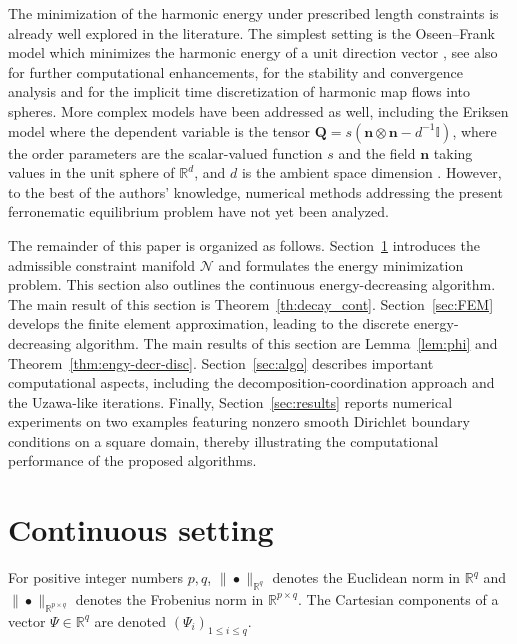 \documentclass[a4paper,11pt]{article}
\theoremstyle{definition}
\theoremstyle{remark}
\numberwithin{equation}{section}
\newcommand{\Qvec}{{\boldsymbol Q}}
\newcommand{\Real}{\mathbb{R}}
\newcommand{\bbI}{\mathbb{I}}
\newcommand{\bn}{{\boldsymbol n}}
\newcommand{\calN}{\mathcal{N}}
\begin{document}
The minimization of the harmonic energy under prescribed length constraints is already well explored in the literature. The simplest setting is the Oseen--Frank model which minimizes the harmonic energy of a unit direction vector   \cite{Alouges:1997:Harmonic_map,Cohen:Lin:Luskin,Lin:Luskin:1989},  see also \cite{Pierre2004}  for further computational enhancements,  \cite{Bartels:2005:FEscheme_harmonic_maps}  for the stability and convergence analysis and  \cite{Bartels:2007:harmonic-map-flow}  for the implicit time discretization of harmonic map flows into spheres. More complex models have been addressed as well, including the Eriksen model where the dependent variable is the tensor $\Qvec=s(\bn\otimes\bn - d^{-1}\bbI)$, where the order parameters are the scalar-valued function $s$ and the field $\bn$ taking values in the unit sphere of $\Real^d$, and $d$ is the ambient space dimension \cite{Bartels:2014:Q-tensor,Nochetto:2017:FEM,Borthagaray2020}.  However, to the best of the authors' knowledge, numerical methods addressing the present ferronematic equilibrium problem have not yet been analyzed.

The remainder of this paper is organized as follows. Section~\ref{sec:cont} introduces the admissible constraint manifold $\calN$ and formulates the energy minimization problem. This section also outlines the continuous energy-decreasing algorithm. The main result of this section is Theorem~\ref{th:decay_cont}. Section~\ref{sec:FEM} develops the finite element approximation, leading to the discrete energy-decreasing algorithm. The main results of this section are Lemma~\ref{lem:phi} and Theorem~\ref{thm:engy-decr-disc}.
Section~\ref{sec:algo} describes important computational aspects, including the decomposition-coordination approach and the Uzawa-like iterations. Finally, Section~\ref{sec:results} reports numerical experiments on two examples featuring nonzero smooth Dirichlet boundary conditions  on a square domain,  thereby illustrating the computational performance of the proposed algorithms.



\section{Continuous setting}
\label{sec:cont}

For positive integer numbers $p,q$, $\|\bullet\|_{\Real^q}$ denotes the Euclidean norm in $\Real^q$ and $\|\bullet\|_{\Real^{p\times q}}$ denotes the Frobenius norm in $\Real^{p\times q}$.
The Cartesian components of a vector $\Psi\in\Real^q$ are denoted $(\Psi_i)_{1\le i\le q}$.
\end{document}
